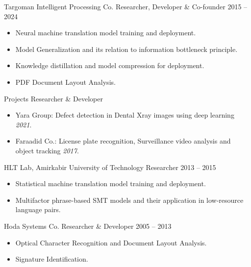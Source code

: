 \documentclass[11pt, a4paper]{awesome-cv}
\begin{document}

\cvevent
{Targoman Intelligent Processing Co.}
{Researcher, Developer \& Co-founder}
{2015 -- 2024}
{}
{
  \begin{itemize}
    \item Neural machine translation model training and deployment.
    \item Model Generalization and its relation to information bottleneck principle.
    \item Knowledge distillation and model compression for deployment.
    \item PDF Document Layout Analysis.
  \end{itemize}
}

\cvevent
{Projects}
{Researcher \& Developer}
{}
{}
{
  \begin{itemize}
    \item Yara Group: Defect detection in Dental Xray images using deep learning
          \textit{2021}.
    \item Faraadid Co.: License plate recognition, Surveillance video analysis and object
          tracking \textit{2017}.
  \end{itemize}
}

\cvevent
{HLT Lab, Amirkabir University of Technology}
{Researcher}
{2013 -- 2015}
{}
{
  \begin{itemize}
    \item Statistical machine translation model training and deployment.
    \item Multifactor phrase-based SMT models and their application in low-resource
          language pairs.
  \end{itemize}
}

\cvevent
{Hoda Systems Co.}
{Researcher \& Developer}
{2005 -- 2013}
{}
{
  \begin{itemize}
    \item Optical Character Recognition and Document Layout Analysis.
    \item Signature Identification.
  \end{itemize}
}

\vskip0.5cm

\end{document}
